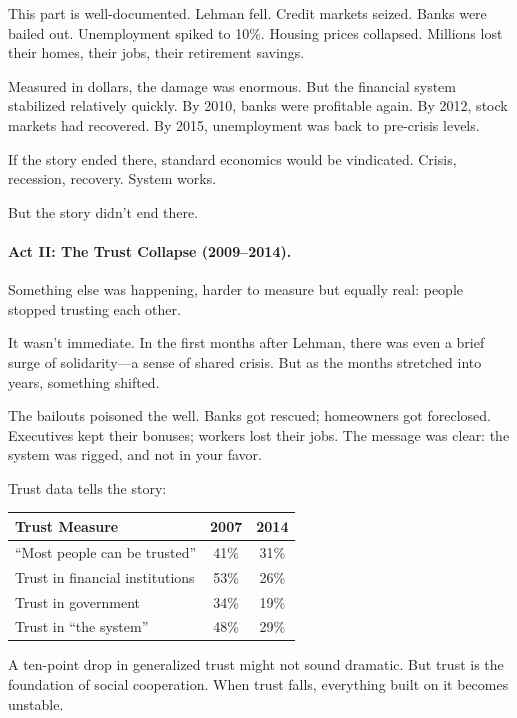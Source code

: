 This part is well-documented. Lehman fell. Credit markets seized. Banks 
were bailed out. Unemployment spiked to 10\%. Housing prices collapsed. 
Millions lost their homes, their jobs, their retirement savings.

Measured in dollars, the damage was enormous. But the financial system 
stabilized relatively quickly. By 2010, banks were profitable again. 
By 2012, stock markets had recovered. By 2015, unemployment was back 
to pre-crisis levels.

If the story ended there, standard economics would be vindicated. 
Crisis, recession, recovery. System works.

But the story didn't end there.

\paragraph{Act II: The Trust Collapse (2009--2014).}

Something else was happening, harder to measure but equally real: 
people stopped trusting each other.

It wasn't immediate. In the first months after Lehman, there was even 
a brief surge of solidarity---a sense of shared crisis. But as the 
months stretched into years, something shifted.

The bailouts poisoned the well. Banks got rescued; homeowners got 
foreclosed. Executives kept their bonuses; workers lost their jobs. 
The message was clear: the system was rigged, and not in your favor.

Trust data tells the story:

\begin{center}
\renewcommand{\arraystretch}{1.2}
\begin{tabular}{lcc}
\hline
\textbf{Trust Measure} & \textbf{2007} & \textbf{2014} \\
\hline
``Most people can be trusted'' & 41\% & 31\% \\
Trust in financial institutions & 53\% & 26\% \\
Trust in government & 34\% & 19\% \\
Trust in ``the system'' & 48\% & 29\% \\
\hline
\end{tabular}
\end{center}

A ten-point drop in generalized trust might not sound dramatic. But trust 
is the foundation of social cooperation. When trust falls, everything 
built on it becomes unstable.


